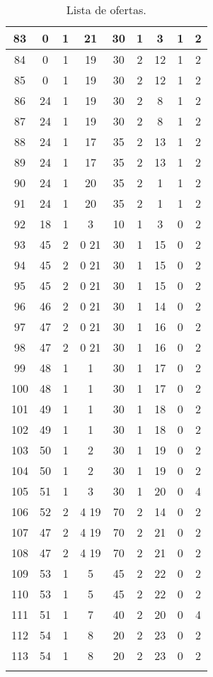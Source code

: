 \begin{apendices}
{\begin{longtable}{|c|c|c|c|c|c|c|c|c|}
83 & 0 & 1 & 21 & 30 & 1 & 3 & 1 & 2 \\ \hline
84 & 0 & 1 & 19 & 30 & 2 & 12 & 1 & 2 \\ \hline
85 & 0 & 1 & 19 & 30 & 2 & 12 & 1 & 2 \\ \hline
86 & 24 & 1 & 19 & 30 & 2 & 8 & 1 & 2 \\ \hline
87 & 24 & 1 & 19 & 30 & 2 & 8 & 1 & 2 \\ \hline
88 & 24 & 1 & 17 & 35 & 2 & 13 & 1 & 2 \\ \hline
89 & 24 & 1 & 17 & 35 & 2 & 13 & 1 & 2 \\ \hline
90 & 24 & 1 & 20 & 35 & 2 & 1 & 1 & 2 \\ \hline
91 & 24 & 1 & 20 & 35 & 2 & 1 & 1 & 2 \\ \hline
92 & 18 & 1 & 3 & 10 & 1 & 3 & 0 & 2 \\ \hline
93 & 45 & 2 & 0 21 & 30 & 1 & 15 & 0 & 2 \\ \hline
94 & 45 & 2 & 0 21 & 30 & 1 & 15 & 0 & 2 \\ \hline
95 & 45 & 2 & 0 21 & 30 & 1 & 15 & 0 & 2 \\ \hline
96 & 46 & 2 & 0 21 & 30 & 1 & 14 & 0 & 2 \\ \hline
97 & 47 & 2 & 0 21 & 30 & 1 & 16 & 0 & 2 \\ \hline
98 & 47 & 2 & 0 21 & 30 & 1 & 16 & 0 & 2 \\ \hline
99 & 48 & 1 & 1 & 30 & 1 & 17 & 0 & 2 \\ \hline
100 & 48 & 1 & 1 & 30 & 1 & 17 & 0 & 2 \\ \hline
101 & 49 & 1 & 1 & 30 & 1 & 18 & 0 & 2 \\ \hline
102 & 49 & 1 & 1 & 30 & 1 & 18 & 0 & 2 \\ \hline
103 & 50 & 1 & 2 & 30 & 1 & 19 & 0 & 2 \\ \hline
104 & 50 & 1 & 2 & 30 & 1 & 19 & 0 & 2 \\ \hline
105 & 51 & 1 & 3 & 30 & 1 & 20 & 0 & 4 \\ \hline
106 & 52 & 2 & 4 19 & 70 & 2 & 14 & 0 & 2 \\ \hline
107 & 47 & 2 & 4 19 & 70 & 2 & 21 & 0 & 2 \\ \hline
108 & 47 & 2 & 4 19 & 70 & 2 & 21 & 0 & 2 \\ \hline
109 & 53 & 1 & 5 & 45 & 2 & 22 & 0 & 2 \\ \hline
110 & 53 & 1 & 5 & 45 & 2 & 22 & 0 & 2 \\ \hline
111 & 51 & 1 & 7 & 40 & 2 & 20 & 0 & 4 \\ \hline
112 & 54 & 1 & 8 & 20 & 2 & 23 & 0 & 2 \\ \hline
113 & 54 & 1 & 8 & 20 & 2 & 23 & 0 & 2 \\ \hline
\caption{Lista de ofertas.\label{ap-lista-ofertas-2013}}
\end{longtable}
}
\pagebreak


\end{apendices}
